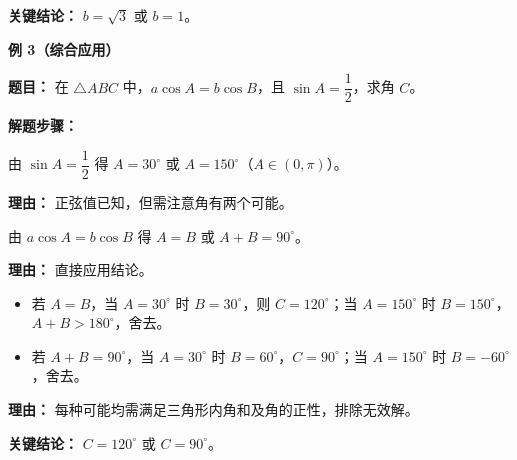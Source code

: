 \begin{examplebox}
	\textbf{\textcolor{CExample}{关键结论：}}
	$b = \sqrt{3}$ 或 $b = 1$。

	\medskip
	\textbf{\textcolor{CExample}{例 3（综合应用）}}

	\textbf{\textcolor{CExample}{题目：}}
	在 $\triangle ABC$ 中，$a\cos A = b\cos B$，且 $\sin A = \dfrac{1}{2}$，求角 $C$。

	\textbf{\textcolor{CExample}{解题步骤：}}
	\begin{description}[style=nextline, leftmargin=2.8em, labelsep=0.5em, itemsep=0.45em]
		\item[\textbf{第一步（求 $A$）：}] 由 $\sin A = \dfrac{1}{2}$ 得 $A = 30^{\circ}$ 或 $A = 150^{\circ}$（$A\in(0,\pi)$）。
			\par\textbf{理由：} 正弦值已知，但需注意角有两个可能。
		\item[\textbf{第二步（套用结论）：}] 由 $a\cos A = b\cos B$ 得 $A = B$ 或 $A + B = 90^{\circ}$。
			\par\textbf{理由：} 直接应用结论。
		\item[\textbf{第三步（分类讨论与内角验证）：}]
			\begin{itemize}[leftmargin=*, itemsep=0.2em, topsep=0em]
			\item 若 $A = B$，当 $A = 30^{\circ}$ 时 $B = 30^{\circ}$，则 $C = 120^{\circ}$；当 $A = 150^{\circ}$ 时 $B = 150^{\circ}$，$A+B>180^{\circ}$，舍去。
			\item 若 $A + B = 90^{\circ}$，当 $A = 30^{\circ}$ 时 $B = 60^{\circ}$，$C = 90^{\circ}$；当 $A = 150^{\circ}$ 时 $B = -60^{\circ}$，舍去。
		\end{itemize}
			\par\textbf{理由：} 每种可能均需满足三角形内角和及角的正性，排除无效解。
	\end{description}

	\textbf{\textcolor{CExample}{关键结论：}}
	$C = 120^{\circ}$ 或 $C = 90^{\circ}$。
\end{examplebox}
